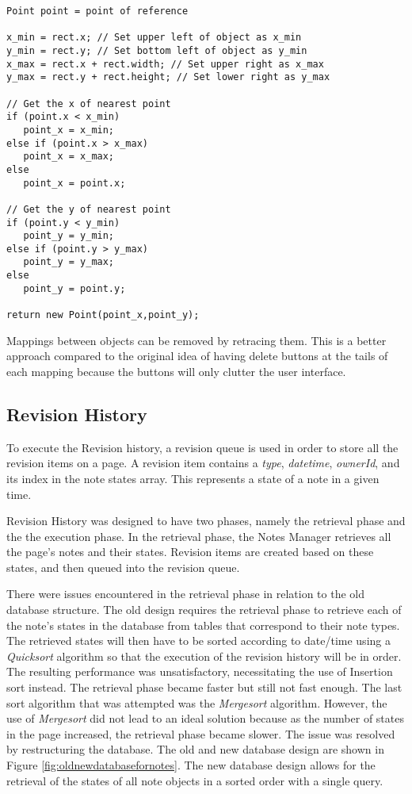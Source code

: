 \begin{lstlisting}[frame=single, label=lst:getobjectnearestpointalgorithm, caption=\textit{GetObjectNearestPoint} algorithm as posted by Alex Weldon in indiegamer.com]
Point point = point of reference

x_min = rect.x; // Set upper left of object as x_min 
y_min = rect.y; // Set bottom left of object as y_min
x_max = rect.x + rect.width; // Set upper right as x_max
y_max = rect.y + rect.height; // Set lower right as y_max

// Get the x of nearest point
if (point.x < x_min)
   point_x = x_min;
else if (point.x > x_max) 
   point_x = x_max;
else 
   point_x = point.x;

// Get the y of nearest point
if (point.y < y_min) 
   point_y = y_min;
else if (point.y > y_max) 
   point_y = y_max;
else 
   point_y = point.y;

return new Point(point_x,point_y);
\end{lstlisting}

Mappings between objects can be removed by retracing them. This is a better approach compared to the original idea of having delete buttons at the tails of each mapping because the buttons will only clutter the user interface.

\subsection{Revision History}
\label{sec:revisionhistory}

To execute the Revision history, a revision queue is used in order to store all the revision items on a page. A revision item contains a \textit{type}, \textit{datetime}, \textit{ownerId}, and its index in the note states array. This represents a state of a note in a given time.

Revision History was designed to have two phases, namely the retrieval phase and the the execution phase. In the retrieval phase, the Notes Manager retrieves all the page's notes and their states. Revision items are created based on these states, and then queued into the revision queue. 

There were issues encountered in the retrieval phase in relation to the old database structure. The old design requires the retrieval phase to retrieve each of the note's states in the database from tables that correspond to their note types. The retrieved states will then have to be sorted according to date/time using a \textit{Quicksort} algorithm so that the execution of the revision history will be in order. The resulting performance was unsatisfactory, necessitating the use of 
Insertion sort instead. The retrieval phase became faster but still not fast enough. The last sort algorithm that was attempted was the \textit{Mergesort} algorithm. However, the use of \textit{Mergesort} did not lead to an ideal solution because as the number of states in the page increased, the retrieval phase became slower. The issue was resolved by restructuring the database. The old and new database design are shown in Figure \ref{fig:oldnewdatabasefornotes}. The new database design allows for the retrieval of the states of all note objects in a sorted order with a single query.

